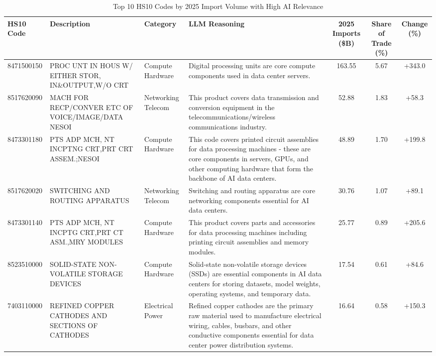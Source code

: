 \begin{landscape}
\begin{table}[htbp]
\centering
\footnotesize
\caption{Top 10 HS10 Codes by 2025 Import Volume with High AI Relevance}
\label{tab:top10_high_relevance_landscape}
\setlength{\tabcolsep}{2mm}
\renewcommand{\arraystretch}{1.0}
\begin{tabular}{lp{4cm}lp{6cm}ccc}
\toprule
HS10 Code & Description & Category & LLM Reasoning & 2025 Imports (\$B) & Share of Trade (\%) & Change (\%) \\
\midrule
8471500150 & {\scriptsize PROC UNT IN HOUS W/ EITHER STOR, IN\&OUTPUT,W/O CRT} & Compute Hardware & {\scriptsize Digital processing units are core compute components used in data center servers.} & 163.55 & 5.67 & +343.0 \\
8517620090 & {\scriptsize MACH FOR RECP/CONVER ETC OF VOICE/IMAGE/DATA NESOI} & Networking Telecom & {\scriptsize This product covers data transmission and conversion equipment in the telecommunications/wireless communications industry.} & 52.88 & 1.83 & +58.3 \\
8473301180 & {\scriptsize PTS ADP MCH, NT INCPTNG CRT,PRT CRT ASSEM.;NESOI} & Compute Hardware & {\scriptsize This code covers printed circuit assemblies for data processing machines - these are core components in servers, GPUs, and other computing hardware that form the backbone of AI data centers.} & 48.89 & 1.70 & +199.8 \\
8517620020 & {\scriptsize SWITCHING AND ROUTING APPARATUS} & Networking Telecom & {\scriptsize Switching and routing apparatus are core networking components essential for AI data centers.} & 30.76 & 1.07 & +89.1 \\
8473301140 & {\scriptsize PTS ADP MCH, NT INCPTG CRT,PRT CT ASM.,MRY MODULES} & Compute Hardware & {\scriptsize This product covers parts and accessories for data processing machines including printing circuit assemblies and memory modules.} & 25.77 & 0.89 & +205.6 \\
8523510000 & {\scriptsize SOLID-STATE NON-VOLATILE STORAGE DEVICES} & Compute Hardware & {\scriptsize Solid-state non-volatile storage devices (SSDs) are essential components in AI data centers for storing datasets, model weights, operating systems, and temporary data.} & 17.54 & 0.61 & +84.6 \\
7403110000 & {\scriptsize REFINED COPPER CATHODES AND SECTIONS OF CATHODES} & Electrical Power & {\scriptsize Refined copper cathodes are the primary raw material used to manufacture electrical wiring, cables, busbars, and other conductive components essential for data center power distribution systems.} & 16.64 & 0.58 & +150.3 \\

\end{tabular}
\end{table}
\end{landscape}
